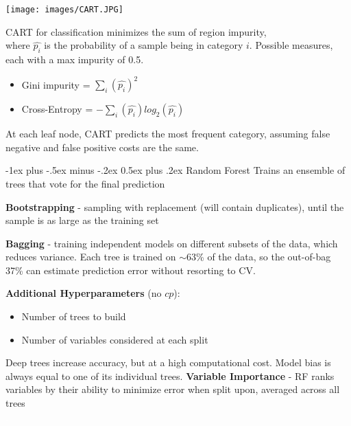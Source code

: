 \documentclass[10pt,landscape]{article}
\makeatletter
\renewcommand{\subsection}{\@startsection{subsection}{2}{0mm}%
                                {-1ex plus -.5ex minus -.2ex}%
                                {0.5ex plus .2ex}%
                                {\normalfont\normalsize\bfseries}}
\makeatother
\begin{document}
\begin{multicols}{3}
\begin{center}
\vspace{-1mm}
    \texttt{[image: images/CART.JPG]}
\end{center}
\vspace{-2mm}
CART for classification minimizes the sum of region impurity, \\
where $\hat{p_i}$ is the probability of a sample being in category $i$.
Possible measures, each with a max impurity of 0.5.
\begin{itemize}[label={--},leftmargin=4mm]
\vspace{-1mm}
\itemsep -.4mm 
\item Gini impurity = $\sum_i (\hat{p_i})^2$ 
\item Cross-Entropy = $-\sum_i (\hat{p_i}) log_2(\hat{p_i})$ 
\end{itemize}
At each leaf node, CART predicts the most frequent category, assuming false negative and false positive costs are the same.

\subsection{Random Forest}
Trains an ensemble of trees that vote for the final prediction

\textbf{Bootstrapping} - sampling with replacement (will contain duplicates), until the sample is as large as the training set

\textbf{Bagging} - training independent models on different subsets of the data, which reduces variance. Each tree is trained on $\sim$63\% of the data, so the out-of-bag 37\% can estimate prediction error without resorting to CV.  

\textbf{Additional Hyperparameters} (no $cp$):
\begin{itemize}[label={--},leftmargin=4mm]
\vspace{-1mm}
\itemsep -.4mm 
\item Number of trees to build
\item Number of variables considered at each split
\end{itemize}
Deep trees increase accuracy, but at a high computational cost. Model bias is always equal to one of its individual trees.
\textbf{Variable Importance} - RF ranks variables by their ability to minimize error when split upon, averaged across all trees 
\columnbreak
\\\textcolor{white}{.}\vspace{-5mm}\\ %

\end{multicols}
\end{document}
